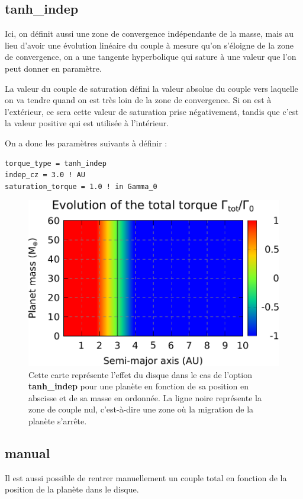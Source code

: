 \subsection{tanh\_indep}\label{sec:tanh_indep}
Ici, on définit aussi une zone de convergence indépendante de la masse, mais au lieu d'avoir une évolution linéaire du couple à mesure qu'on s'éloigne de la zone de convergence, on a une tangente hyperbolique qui sature à une valeur que l'on peut donner en paramètre. 

La valeur du couple de saturation défini la valeur absolue du couple vers laquelle on va tendre quand on est très loin de la zone de convergence. Si on est à l'extérieur, ce sera cette valeur de saturation prise négativement, tandis que c'est la valeur positive qui est utilisée à l'intérieur.

On a donc les paramètres suivants à définir : 
\begin{verbatim}
torque_type = tanh_indep
indep_cz = 3.0 ! AU
saturation_torque = 1.0 ! in Gamma_0
\end{verbatim}

\begin{figure}[htbp]
\centering
\includegraphics[width=0.65\linewidth]{figure/migration_map/tanh_indep.pdf}
\caption[Carte de migration correspondant à une zone de convergence \textbf{tanh\_indep}.]{Cette carte représente l'effet du
disque dans le cas de l'option \textbf{tanh\_indep} pour une planète en fonction de sa position en abscisse et de sa masse en
ordonnée. La ligne noire représente la zone de couple nul, c'est-à-dire une zone où la migration de la planète s'arrête.}
\end{figure}

\subsection{manual}
Il est aussi possible de rentrer manuellement un couple total en fonction de la position de la planète dans le disque. 

